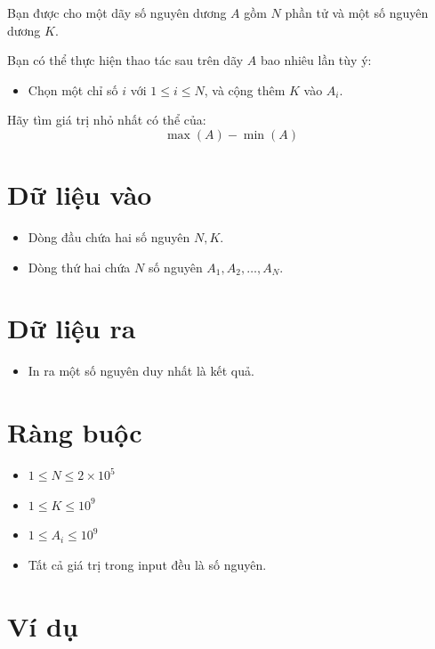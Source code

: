 Bạn được cho một dãy số nguyên dương $A$ gồm $N$ phần tử và một số nguyên dương $K$.

Bạn có thể thực hiện thao tác sau trên dãy $A$ bao nhiêu lần tùy ý:
\begin{itemize}
    \item Chọn một chỉ số $i$ với $1 \le i \le N$, và cộng thêm $K$ vào $A_i$.
\end{itemize}

Hãy tìm giá trị nhỏ nhất có thể của:
$$
\max(A) - \min(A)
$$

\section*{Dữ liệu vào}

\begin{itemize}
    \item Dòng đầu chứa hai số nguyên $N, K$.
    \item Dòng thứ hai chứa $N$ số nguyên $A_1, A_2, \ldots, A_N$.
\end{itemize}

\section*{Dữ liệu ra}

\begin{itemize}
    \item In ra một số nguyên duy nhất là kết quả.
\end{itemize}

\section*{Ràng buộc}

\begin{itemize}
    \item $1 \le N \le 2 \times 10^5$
    \item $1 \le K \le 10^9$
    \item $1 \le A_i \le 10^9$
    \item Tất cả giá trị trong input đều là số nguyên.
\end{itemize}

\section*{Ví dụ}

